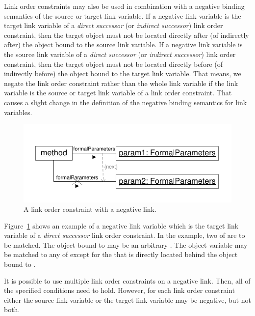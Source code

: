 {Link order constraints may also be used in combination with a negative binding semantics of the source or target link variable. If a negative link variable is the target link variable of a \emph{direct successor} (or \emph{indirect successor}) link order constraint, then the target object must not be located directly after (of indirectly after) the object bound to the source link variable. If a negative link variable is the source link variable of a \emph{direct successor} (or \emph{indirect successor}) link order constraint, then the target object must not be located directly before (of indirectly before) the object bound to the target link variable. That means, we negate the link order constraint rather than the whole link variable if the link variable is the source or target link variable of a link order constraint. That causes a slight change in the definition of the negative binding semantics for link variables.

\begin{figure}[htbp]
\center
\includegraphics[width=0.75\columnwidth]{figures/LinkOrderConstraintDirectSuccessorNegative}
\caption{A link order constraint with a negative link.}
\label{fig:linkOrderConstraintDirectSuccessorNegative}
\end{figure}

Figure~\ref{fig:linkOrderConstraintDirectSuccessorNegative} shows an example of a negative link variable which is the target link variable of a \emph{direct successor} link order constraint. In the example, two  of  are to be matched. The object bound to  may be an arbitrary . The object variable  may be matched to any  of  except for the  that is directly located behind the object bound to .

It is possible to use multiple link order constraints on a negative link. Then, all of the specified conditions need to hold. However, for each link order constraint either the source link variable or the target link variable may be negative, but not both.

}

